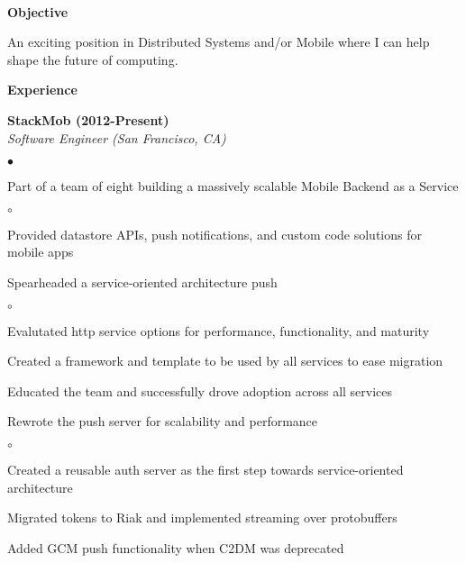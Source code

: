 \documentclass[ComputerScience]{vita}
\newenvironment{suber}[0]
{\begin{list}{$\bullet$}
	{\setlength{\topsep}{-0.4in}
		\setlength{\leftmargin}{0.25in}
		\setlength{\itemsep}{0.01in}}
}
{\end{list}\par}
\newenvironment{suberb}[0]
{\begin{list}{$\circ$}
	{\setlength{\topsep}{-0.4in}
		\setlength{\leftmargin}{0.25in}
		\setlength{\itemsep}{0.01in}}
}
{\end{list}\par}
\begin{document}
\topmargin=-1in
\title{}
\begin{vita}
\quad\\
{\bf {\large Objective}}\ \hrulefill
\begin{list}{}{\setlength{\leftmargin}{.25in}}
\item An exciting position in Distributed Systems and/or
Mobile where I can help shape the future of computing.
\end{list}
{\bf{\large Experience}}\ \hrulefill
\begin{list}{}{\setlength{\leftmargin}{.25in}}
    \item {\bf StackMob (2012-Present)}\\
    {\em Software Engineer (San Francisco, CA)}
    \begin{suber}
	\item Part of a team of eight building a massively scalable Mobile Backend as a Service
		\begin{suberb}
			\item Provided datastore APIs, push notifications, and custom code
			solutions for mobile apps
		\end{suberb}
	\item Spearheaded a service-oriented architecture push
		\begin{suberb}
    	\item Evalutated http service options for performance, functionality, and maturity
    	\item Created a framework and template to be used by all services to ease migration
    	\item Educated the team and successfully drove adoption across all services
		\end{suberb}
	\item Rewrote the push server for scalability and performance
		\begin{suberb}
			\item Created a reusable auth server as the first step towards service-oriented architecture
			\item Migrated tokens to Riak and implemented streaming over protobuffers
			\item Added GCM push functionality when C2DM was deprecated
		\end{suberb}

\end{suber}
\end{list}
\end{vita}
\end{document}
